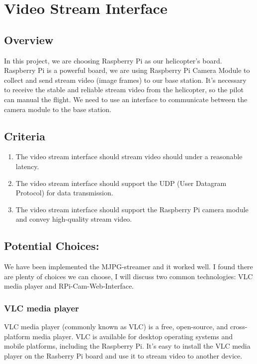 \documentclass[letterpaper, 10, draftclsnofoot, onecolumn,compsoc]{IEEEtran}
\begin{document}
\vspace{2mm}
\section{Video Stream Interface}
\subsection{Overview}
In this project, we are choosing Raspberry Pi as our helicopter’s board. Raspberry Pi is a powerful board, we are using Raspberry Pi Camera Module to collect and send stream video (image frames) to our base station. It’s necessary to receive the stable and reliable stream video from the helicopter, so the pilot can manual the flight. We need to use an interface to communicate between the camera module to the base station.

\subsection{Criteria}
\begin{enumerate}
\item{The video stream interface should stream video should under a reasonable latency.}

\item{The video stream interface should support the UDP (User Datagram Protocol) for data transmission.}

\item{The video stream interface should support the Raspberry Pi camera module and convey high-quality stream video.}

\end{enumerate}

\subsection{Potential Choices:}
We have been implemented the MJPG-streamer and it worked well. I found there are plenty of choices we can choose, I will discuss two common technologies: VLC media player and RPi-Cam-Web-Interface.

\subsubsection{VLC media player}
VLC media player (commonly known as VLC)\cite{r4} is a free, open-source, and cross-platform media player. VLC is available for desktop operating systems and mobile platforms, including the Raspberry Pi. It's easy to install the VLC media player on the Rasberry Pi board and use it to stream video to another device.
\end{document}

